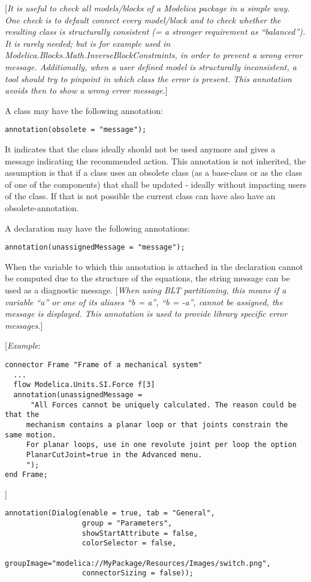 {[}\emph{It is useful to check all models/blocks of a Modelica package
in a simple way. One check is to default connect every model/block and
to check whether the resulting class is structurally consistent (= a
stronger requirement as ``balanced''). It is rarely needed; but is for
example used in Modelica.Blocks.Math.InverseBlockConstraints, in order
to prevent a wrong error message. Additionally, when a user defined
model is structurally inconsistent, a tool should try to pinpoint in
which class the error is present. This annotation avoids then to show a
wrong error message.}{]}

A class may have the following annotation:
\begin{lstlisting}[language=modelica]
  annotation(obsolete = "message");
\end{lstlisting}

It indicates that the class ideally should not be used anymore and gives
a message indicating the recommended action.
This annotation is not inherited, the assumption is that if a class uses
an obsolete class (as a base-class or as the class of one of the components)
that shall be updated - ideally without impacting users of the class.
If that is not possible the current class can have also have an obsolete-annotation.

A declaration may have the following annotations:
\begin{lstlisting}[language=modelica]
  annotation(unassignedMessage = "message");
\end{lstlisting}

When the variable to which this annotation is attached in the
declaration cannot be computed due to the structure of the equations,
the string message can be used as a diagnostic message. {[}\emph{When
using BLT partitioning, this means if a variable ``a'' or one of its
aliases ``b = a'', ``b = -a'', cannot be assigned, the message is
displayed. This annotation is used to provide library specific error
messages.}{]}

{[}\emph{Example}:

\begin{lstlisting}[language=modelica]
connector Frame "Frame of a mechanical system"
  ...
  flow Modelica.Units.SI.Force f[3]
  annotation(unassignedMessage =
      "All Forces cannot be uniquely calculated. The reason could be that the
     mechanism contains a planar loop or that joints constrain the same motion.
     For planar loops, use in one revolute joint per loop the option
     PlanarCutJoint=true in the Advanced menu.
     ");
end Frame;
\end{lstlisting}
{]}
\begin{lstlisting}[language=modelica]
annotation(Dialog(enable = true, tab = "General",
                  group = "Parameters",
                  showStartAttribute = false,
                  colorSelector = false,
                  groupImage="modelica://MyPackage/Resources/Images/switch.png",
                  connectorSizing = false));
\end{lstlisting}

